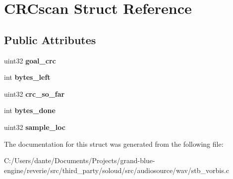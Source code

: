 \hypertarget{struct_c_r_cscan}{}\section{C\+R\+Cscan Struct Reference}
\label{struct_c_r_cscan}
\subsection*{Public Attributes}
\begin{DoxyCompactItemize}
\item 
\mbox{\label{struct_c_r_cscan_a530cd3f5d8a6ee4c095e405695b54d04}} 
uint32 {\bfseries goal\+\_\+crc}
\item 
\mbox{\label{struct_c_r_cscan_a8cfbc584d3b4344d02e5d64b50447d1e}} 
int {\bfseries bytes\+\_\+left}
\item 
\mbox{\label{struct_c_r_cscan_a2604a61beb2f4718d2c0c5641264cebe}} 
uint32 {\bfseries crc\+\_\+so\+\_\+far}
\item 
\mbox{\label{struct_c_r_cscan_a74ee9da9e00c74c1f519d31a2d042457}} 
int {\bfseries bytes\+\_\+done}
\item 
\mbox{\label{struct_c_r_cscan_a444610761de18db38c7664e702a5e29a}} 
uint32 {\bfseries sample\+\_\+loc}
\end{DoxyCompactItemize}


The documentation for this struct was generated from the following file\+:\begin{DoxyCompactItemize}
\item 
C\+:/\+Users/dante/\+Documents/\+Projects/grand-\/blue-\/engine/reverie/src/third\+\_\+party/soloud/src/audiosource/wav/stb\+\_\+vorbis.\+c\end{DoxyCompactItemize}
